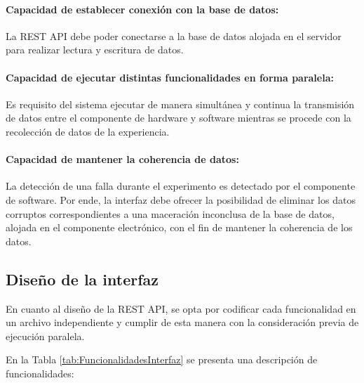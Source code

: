             \paragraph{Capacidad de establecer conexión con la base de datos:} 
                \par La REST API debe poder conectarse a la base de datos alojada en el servidor para realizar lectura y escritura de datos.
       
            \paragraph{Capacidad de ejecutar distintas funcionalidades en forma paralela:}
                \par Es requisito del sistema ejecutar de manera simultánea y continua la transmisión de datos entre el componente de hardware y software mientras se procede con la recolección de datos de la experiencia.
            
            \paragraph{Capacidad de mantener la coherencia de datos:}
                \par La detección de una falla durante el experimento es detectado por el componente de software. Por ende, la interfaz debe ofrecer la posibilidad de eliminar los datos corruptos correspondientes a una maceración inconclusa de la base de datos, alojada en el componente electrónico, con el fin de mantener la coherencia de los datos.
            
        
        
        \subsection{Diseño de la interfaz}
            \par En cuanto al diseño de la REST API, se opta por codificar cada funcionalidad en un archivo independiente y cumplir de esta manera con la consideración previa de ejecución paralela.
            \par En la Tabla \ref{tab:FuncionalidadesInterfaz} se presenta una descripción de funcionalidades:
            
